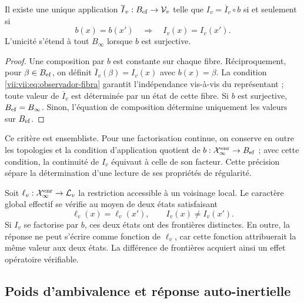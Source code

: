 \begin{theorem}
\label{vii:vii:thm:observador-factorizacion}
Il existe une unique application \(\overline I_v:B_{\rm ef}\to\mathcal V_v\)
telle que \(I_v=\overline I_v\circ b\) si et seulement si
\begin{equation}
 b(x)=b(x')\quad\Longrightarrow\quad I_v(x)=I_v(x').
 \label{vii:vii:eq:observador-fibra}
\end{equation}
L'unicité s'étend à tout \(B_\infty\) lorsque \(b\) est
surjective.
\end{theorem}

\begin{proof}
Une composition par \(b\) est constante sur chaque fibre. Réciproquement,
pour \(\beta\in B_{\rm ef}\), on définit
\(\overline I_v(\beta)=I_v(x)\) avec \(b(x)=\beta\).
La condition \eqref{vii:vii:eq:observador-fibra} garantit l'indépendance
vis-à-vis du représentant ; toute valeur de \(\overline I_v\) est déterminée
par un état de cette fibre. Si \(b\) est surjective,
\(B_{\rm ef}=B_\infty\). Sinon, l'équation de composition
détermine uniquement les valeurs sur \(B_{\rm ef}\).
\end{proof}

Ce critère est ensembliste. Pour une factorisation continue, on
conserve en outre les topologies et la condition d'application quotient
de \(b:\mathcal X_\infty^{\rm enr}\to B_{\rm ef}\) ; avec cette condition, la
continuité de \(I_v\) équivaut à celle de son facteur. Cette précision
sépare la détermination d'une lecture de ses propriétés de régularité.

Soit \(\ell_v:\mathcal X_\infty^{\rm enr}\to\mathcal L_v\) la restriction accessible à un voisinage local. Le caractère global effectif se vérifie au moyen de deux états satisfaisant
\begin{equation}
 \ell_v(x)=\ell_v(x'),\qquad I_v(x)\neq I_v(x').
 \label{vii:vii:eq:observador-testigo-global}
\end{equation}
Si \(I_v\) se factorise par \(b\), ces deux états ont des frontières
distinctes. En outre, la réponse ne peut s'écrire comme fonction de
\(\ell_v\), car cette fonction attribuerait la même valeur aux deux états.
La différence de frontières acquiert ainsi un effet opératoire vérifiable.

\subsection{Poids d'ambivalence et réponse auto-inertielle}
\label{vii:vii:sec:observador-ambivalencia}


